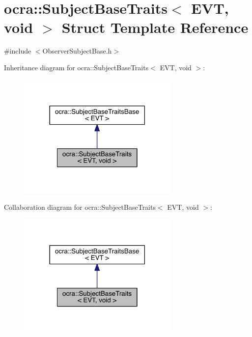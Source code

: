 \hypertarget{structocra_1_1SubjectBaseTraits_3_01EVT_00_01void_01_4}{}\section{ocra\+:\+:Subject\+Base\+Traits$<$ E\+VT, void $>$ Struct Template Reference}
\label{structocra_1_1SubjectBaseTraits_3_01EVT_00_01void_01_4}


{\ttfamily \#include $<$Observer\+Subject\+Base.\+h$>$}



Inheritance diagram for ocra\+:\+:Subject\+Base\+Traits$<$ E\+VT, void $>$\+:\nopagebreak
\begin{figure}[H]
\begin{center}
\leavevmode
\includegraphics[width=225pt]{dc/d1e/structocra_1_1SubjectBaseTraits_3_01EVT_00_01void_01_4__inherit__graph}
\end{center}
\end{figure}


Collaboration diagram for ocra\+:\+:Subject\+Base\+Traits$<$ E\+VT, void $>$\+:\nopagebreak
\begin{figure}[H]
\begin{center}
\leavevmode
\includegraphics[width=225pt]{d7/df7/structocra_1_1SubjectBaseTraits_3_01EVT_00_01void_01_4__coll__graph}
\end{center}
\end{figure}
